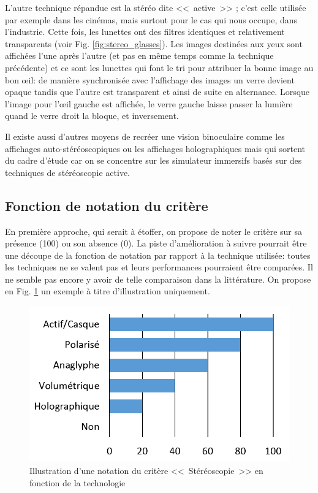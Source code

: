 	\par L'autre technique répandue est la stéréo dite <<~active~>> ; c'est celle utilisée par exemple dans les cinémas, mais surtout pour le cas qui nous occupe, dans l'industrie. Cette fois, les lunettes ont des filtres identiques et relativement transparents (voir Fig. \ref{fig:stereo_glasses}). Les images destinées aux yeux sont affichées l'une après l'autre (et pas en même temps comme la technique précédente) et ce sont les lunettes qui font le tri pour attribuer la bonne image au bon œil: de manière synchronisée avec l'affichage des images un verre devient opaque tandis que l'autre est transparent et ainsi de suite en alternance. Lorsque l'image pour l'œil gauche est affichée, le verre gauche laisse passer la lumière quand le verre droit la bloque, et inversement.
	
	\par Il existe aussi d'autres moyens de recréer une vision binoculaire comme les affichages auto-stéréoscopiques ou les affichages holographiques mais qui sortent du cadre d'étude car on se concentre sur les simulateur immersifs basés sur des techniques de stéréoscopie active. 
	
	\subsection{Fonction de notation du critère}
	\par En première approche, qui serait à étoffer, on propose de noter le critère sur sa présence (100) ou son absence (0). La piste d'amélioration à suivre pourrait être une découpe de la fonction de notation par rapport à la technique utilisée: toutes les techniques ne se valent pas et leurs performances pourraient être comparées. Il ne semble pas encore y avoir de telle comparaison dans la littérature. On propose en Fig. \ref{fig:stereo_grade_techno} un exemple à titre d'illustration uniquement.
	
	\begin{figure}[h]
		\centering
		\includegraphics[scale=1]{Figures/StereoTechnoScore}
		\caption{Illustration d'une notation du critère <<~Stéréoscopie~>> en fonction de la technologie}
		\label{fig:stereo_grade_techno}
	\end{figure}
	
